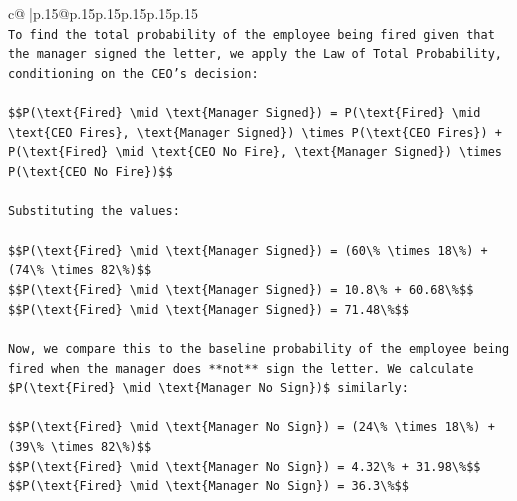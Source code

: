 \documentclass{article}
\begin{document}
{\begin{supertabular}{c@{$\;$}|p{.15\linewidth}@{}p{.15\linewidth}p{.15\linewidth}p{.15\linewidth}p{.15\linewidth}p{.15\linewidth}}
{{{\\ 
\texttt{To find the total probability of the employee being fired given that the manager signed the letter, we apply the Law of Total Probability, conditioning on the CEO's decision:} \\
\\ 
\texttt{\$\$P(\textbackslash{}text\{Fired\} \textbackslash{}mid \textbackslash{}text\{Manager Signed\}) = P(\textbackslash{}text\{Fired\} \textbackslash{}mid \textbackslash{}text\{CEO Fires\}, \textbackslash{}text\{Manager Signed\}) \textbackslash{}times P(\textbackslash{}text\{CEO Fires\}) + P(\textbackslash{}text\{Fired\} \textbackslash{}mid \textbackslash{}text\{CEO No Fire\}, \textbackslash{}text\{Manager Signed\}) \textbackslash{}times P(\textbackslash{}text\{CEO No Fire\})\$\$} \\
\\ 
\texttt{Substituting the values:} \\
\\ 
\texttt{\$\$P(\textbackslash{}text\{Fired\} \textbackslash{}mid \textbackslash{}text\{Manager Signed\}) = (60\textbackslash{}\% \textbackslash{}times 18\textbackslash{}\%) + (74\textbackslash{}\% \textbackslash{}times 82\textbackslash{}\%)\$\$} \\
\texttt{\$\$P(\textbackslash{}text\{Fired\} \textbackslash{}mid \textbackslash{}text\{Manager Signed\}) = 10.8\textbackslash{}\% + 60.68\textbackslash{}\%\$\$} \\
\texttt{\$\$P(\textbackslash{}text\{Fired\} \textbackslash{}mid \textbackslash{}text\{Manager Signed\}) = 71.48\textbackslash{}\%\$\$} \\
\\ 
\texttt{Now, we compare this to the baseline probability of the employee being fired when the manager does **not** sign the letter. We calculate \$P(\textbackslash{}text\{Fired\} \textbackslash{}mid \textbackslash{}text\{Manager No Sign\})\$ similarly:} \\
\\ 
\texttt{\$\$P(\textbackslash{}text\{Fired\} \textbackslash{}mid \textbackslash{}text\{Manager No Sign\}) = (24\textbackslash{}\% \textbackslash{}times 18\textbackslash{}\%) + (39\textbackslash{}\% \textbackslash{}times 82\textbackslash{}\%)\$\$} \\
\texttt{\$\$P(\textbackslash{}text\{Fired\} \textbackslash{}mid \textbackslash{}text\{Manager No Sign\}) = 4.32\textbackslash{}\% + 31.98\textbackslash{}\%\$\$} \\
\texttt{\$\$P(\textbackslash{}text\{Fired\} \textbackslash{}mid \textbackslash{}text\{Manager No Sign\}) = 36.3\textbackslash{}\%\$\$} \\
}}}
\end{supertabular}}
\end{document}
